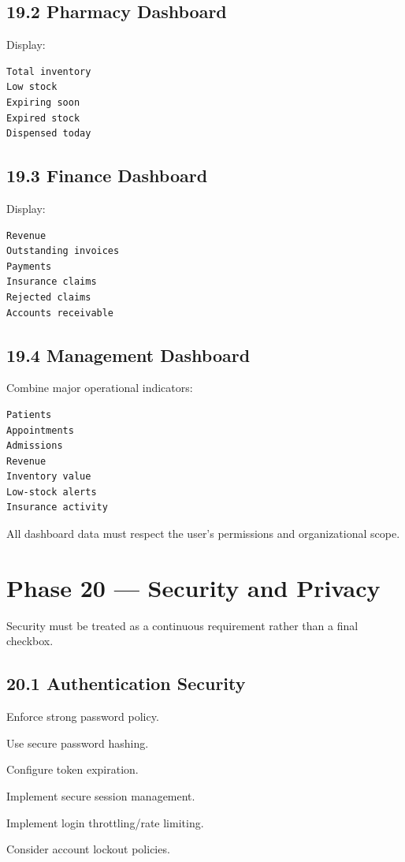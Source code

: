 \documentclass[11pt,a4paper]{article}
\newcommand{\task}[1]{\item[$\square$] #1}
\begin{document}
\subsection{19.2 Pharmacy Dashboard}

Display:

\begin{lstlisting}
Total inventory
Low stock
Expiring soon
Expired stock
Dispensed today
\end{lstlisting}

\subsection{19.3 Finance Dashboard}

Display:

\begin{lstlisting}
Revenue
Outstanding invoices
Payments
Insurance claims
Rejected claims
Accounts receivable
\end{lstlisting}

\subsection{19.4 Management Dashboard}

Combine major operational indicators:

\begin{lstlisting}
Patients
Appointments
Admissions
Revenue
Inventory value
Low-stock alerts
Insurance activity
\end{lstlisting}

All dashboard data must respect the user's permissions and organizational
scope.

\section{Phase 20 --- Security and Privacy}

Security must be treated as a continuous requirement rather than a final
checkbox.

\subsection{20.1 Authentication Security}

\task{Enforce strong password policy.}
\task{Use secure password hashing.}
\task{Configure token expiration.}
\task{Implement secure session management.}
\task{Implement login throttling/rate limiting.}
\task{Consider account lockout policies.}
\end{document}
